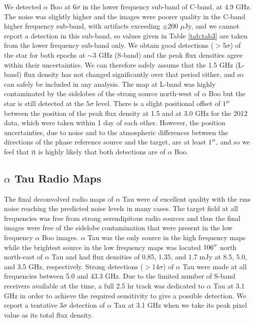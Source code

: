 \documentclass[iop]{emulateapj}
\begin{document}
We detected $\alpha$ Boo at 6$\sigma$ in the lower frequency sub-band of C-band, at 4.9 GHz. The noise was slightly higher and the images were poorer quality in the C-band higher frequency sub-band, with artifacts exceeding $\pm$200 $\mu$Jy, and we cannot report a detection in this sub-band, so values given in Table \ref{tab:tab3} are taken from the lower frequency sub-band only. We obtain good detections ($>$5$\sigma$) of the star for both epochs at $\sim$3 GHz (S-band) and the peak flux densities agree within their uncertainties. We can therefore safely assume that the 1.5 GHz (L-band) flux density has not changed significantly over that period either, and so can safely be included in any analysis. The map at L-band was highly contaminated by the sidelobes of the strong source north-west of $\alpha$ Boo but the star is still detected at the $5\sigma$ level. There is a slight positional offset of $1\mbox{$^{\prime\prime}$}$ between the position of the peak flux density at 1.5 and at 3.0 GHz for the 2012 data, which were taken within 1 day of each other. However, the position uncertainties, due to noise and to the atmospheric differences between the directions of the phase reference source and the target, are at least $1\mbox{$^{\prime\prime}$}$, and so we feel that it is highly likely that both detections are of $\alpha$ Boo. 

\subsection{$\alpha$ Tau Radio Maps} \label{results2}
The final deconvolved radio maps of $\alpha$ Tau were of excellent quality with the rms noise reaching the predicted noise levels in many cases. The target field at all frequencies was free from strong serendipitous radio sources and thus the final images were free of the sidelobe contamination that were present in the low frequency $\alpha$ Boo images. $\alpha$ Tau was the only source in the high frequency maps while the brightest source in the low frequency maps was located $106\mbox{$^{\prime\prime}$}$ north north-east of $\alpha$ Tau and had flux densities of 0.85, 1.35, and 1.7 mJy at 8.5, 5.0, and 3.5 GHz, respectively. Strong detections ($>$14$\sigma$) of $\alpha$ Tau were made at all frequencies between 5.0 and 43.3 GHz. Due to the limited number of S-band receivers available at the time, a full 2.5 hr track was dedicated to $\alpha$ Tau at 3.1 GHz in order to achieve the required sensitivity to give a possible detection. We report a tentative $3\sigma$ detection of $\alpha$ Tau at 3.1 GHz when we take its peak pixel value as its total flux density. 
\end{document}
